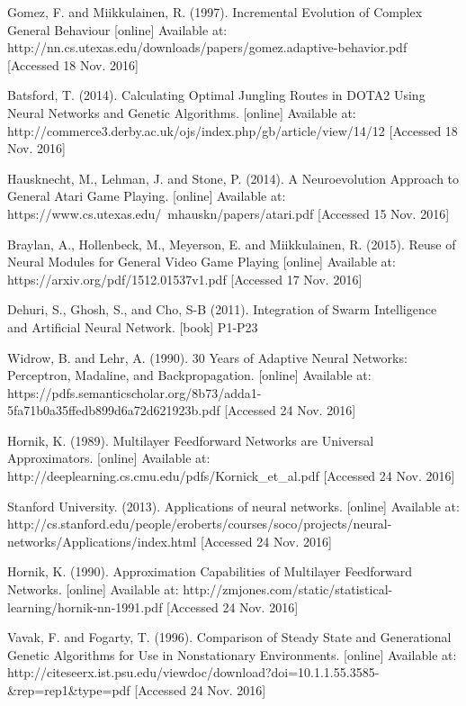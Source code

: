 \documentclass[12pt,a4paper]{article}
\begin{document}
\begin{thebibliography}{10}
	Gomez, F. and Miikkulainen, R.
	(1997).
	Incremental Evolution of Complex General Behaviour
	[online]
	Available at: http://nn.cs.utexas.edu/downloads/papers/gomez.adaptive-behavior.pdf
	[Accessed 18 Nov. 2016]
	
	Batsford, T.
	(2014).
	Calculating Optimal Jungling Routes in DOTA2 Using Neural Networks and Genetic Algorithms.
	[online]
	Available at: http://commerce3.derby.ac.uk/ojs/index.php/gb/article/view/14/12
	[Accessed 18 Nov. 2016]
	
	Hausknecht, M., Lehman, J. and Stone, P.
	(2014).
	A Neuroevolution Approach to General Atari Game Playing.
	[online]
	Available at: https://www.cs.utexas.edu/~mhauskn/papers/atari.pdf
	[Accessed 15 Nov. 2016]
	
	Braylan, A., Hollenbeck, M., Meyerson, E. and Miikkulainen, R.
	(2015).
	Reuse of Neural Modules for General Video Game Playing
	[online]
	Available at: https://arxiv.org/pdf/1512.01537v1.pdf
	[Accessed 17 Nov. 2016]
	
	Dehuri, S., Ghosh, S., and Cho, S-B
	(2011).
	Integration of Swarm Intelligence and Artificial Neural Network.
	[book]
	P1-P23

	Widrow, B. and Lehr, A.
	(1990).
	30 Years of Adaptive Neural Networks: Perceptron, Madaline, and Backpropagation.
	[online]
	Available at: https://pdfs.semanticscholar.org/8b73/adda1-5fa71b0a35ffedb899d6a72d621923b.pdf
	[Accessed 24 Nov. 2016]
	
	Hornik, K.
	(1989).
	Multilayer Feedforward Networks are Universal Approximators.
	[online]
	Available at: http://deeplearning.cs.cmu.edu/pdfs/Kornick\_et\_al.pdf
	[Accessed 24 Nov. 2016]
	
	Stanford University.
	(2013).
	Applications of neural networks.
	[online]
	Available at: http://cs.stanford.edu/people/eroberts/courses/soco/projects/neural-networks/Applications/index.html
	[Accessed 24 Nov. 2016]
	
	Hornik, K.
	(1990).
	Approximation Capabilities of Multilayer Feedforward Networks.
	[online]
	Available at: http://zmjones.com/static/statistical-learning/hornik-nn-1991.pdf
	[Accessed 24 Nov. 2016]
	
	Vavak, F. and Fogarty, T.
	(1996).
	Comparison of Steady State and Generational Genetic Algorithms for Use in Nonstationary Environments.
	[online]
	Available at: http://citeseerx.ist.psu.edu/viewdoc/download?doi=10.1.1.55.3585-\&rep=rep1\&type=pdf
	[Accessed 24 Nov. 2016]
	

\end{thebibliography}
\end{document}
